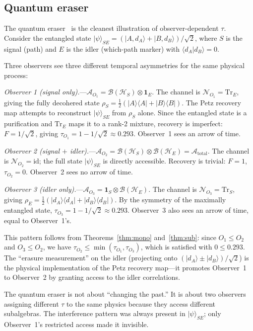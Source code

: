 \documentclass[prl,twocolumn,superscriptaddress,longbibliography,floatfix]{revtex4-2}
\newcommand{\Tr}{\mathrm{Tr}}
\newcommand{\id}{\mathrm{id}}
\newcommand{\chan}{\mathcal{N}}
\newcommand{\hilb}{\mathcal{H}}
\newcommand{\ket}[1]{|#1\rangle}
\newcommand{\braket}[2]{\langle#1|#2\rangle}
\newcommand{\op}[2]{|#1\rangle\langle#2|}
\newcommand{\tauasym}{\tau}
\newcommand{\algO}{\mathcal{A}}
\begin{document}
\subsection{Quantum eraser}
\label{sec:eraser}

The quantum eraser~\cite{Scully1982,Kim2000} is the cleanest
illustration of observer-dependent $\tauasym$.  Consider the
entangled state
$\ket{\psi}_{SE} = (\ket{A,d_A} + \ket{B,d_B})/\sqrt{2}$,
where $S$ is the signal (path) and $E$ is the idler
(which-path marker) with $\braket{d_A}{d_B} = 0$.

Three observers see three different temporal asymmetries for
the same physical process:

\emph{Observer 1 (signal only).}---$\algO_{O_1} =
\mathcal{B}(\hilb_S) \otimes \mathbf{1}_E$.  The channel is
$\chan_{O_1} = \Tr_E$, giving the fully decohered state
$\rho_S = \tfrac{1}{2}(\op{A}{A} + \op{B}{B})$.
The Petz recovery map attempts to reconstruct
$\ket{\psi}_{SE}$ from $\rho_S$ alone.  Since the entangled
state is a purification and $\Tr_E$ maps it to a
rank-2 mixture, recovery is imperfect:
$F = 1/\sqrt{2}$, giving
$\tauasym_{O_1} = 1 - 1/\sqrt{2} \approx 0.293$.
Observer~1 sees an arrow of time.

\emph{Observer 2 (signal $+$ idler).}---$\algO_{O_2} =
\mathcal{B}(\hilb_S) \otimes \mathcal{B}(\hilb_E) =
\algO_{\mathrm{total}}$.  The channel is $\chan_{O_2} = \id$;
the full state $\ket{\psi}_{SE}$ is directly accessible.
Recovery is trivial: $F = 1$, $\tauasym_{O_2} = 0$.
Observer~2 sees no arrow of time.

\emph{Observer 3 (idler only).}---$\algO_{O_3} =
\mathbf{1}_S \otimes \mathcal{B}(\hilb_E)$.  The channel is
$\chan_{O_3} = \Tr_S$, giving $\rho_E =
\tfrac{1}{2}(\op{d_A}{d_A} + \op{d_B}{d_B})$.  By the
symmetry of the maximally entangled state,
$\tauasym_{O_3} = 1 - 1/\sqrt{2} \approx 0.293$.
Observer~3 also sees an arrow of time, equal to Observer~1's.

This pattern follows from Theorems~\ref{thm:mono}
and~\ref{thm:sub}: since $O_1 \leq O_2$ and $O_3 \leq O_2$,
we have $\tauasym_{O_2} \leq \min(\tauasym_{O_1},
\tauasym_{O_3})$, which is satisfied with $0 \leq 0.293$.
The ``erasure measurement'' on the idler
(projecting onto $(\ket{d_A} \pm \ket{d_B})/\sqrt{2}$)
is the physical implementation of the Petz recovery map---it
promotes Observer~1 to Observer~2 by granting access to the
idler correlations.

The quantum eraser is not about ``changing the past.''
It is about two observers assigning different $\tauasym$ to the
same physics because they access different subalgebras.
The interference pattern was always present in
$\ket{\psi}_{SE}$; only Observer~1's restricted access made it
invisible.
\end{document}
